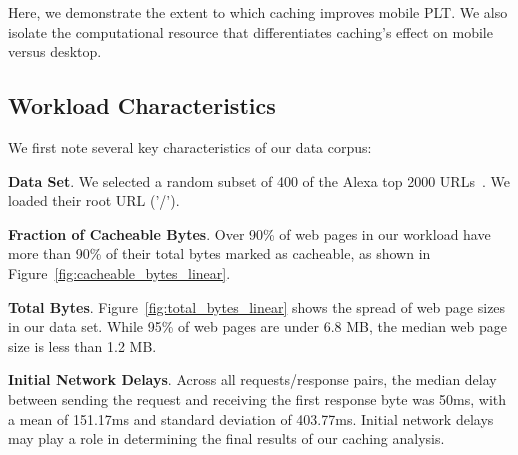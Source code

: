Here, we demonstrate the extent to which caching improves mobile PLT.
We also isolate the computational resource that differentiates caching's effect on mobile versus desktop.

\subsection{Workload Characteristics}
We first note several key characteristics of our data corpus:

\textbf{Data Set}. We selected a random subset of 400 of the Alexa top 2000 URLs~\cite{alexa}. We loaded their root URL ('/').

\textbf{Fraction of Cacheable Bytes}. Over 90\% of web pages in our workload have more than 90\% of their total bytes marked as cacheable, as shown in Figure~\ref{fig:cacheable_bytes_linear}. %

\textbf{Total Bytes}. Figure~\ref{fig:total_bytes_linear} shows the spread of web page sizes in our data set. While 95\% of web pages are under 6.8 MB, the median web page size is less than 1.2 MB.

\textbf{Initial Network Delays}. Across all requests/response pairs, the median delay between sending the request and receiving the first response byte was 50ms, with a mean of 151.17ms and standard deviation of 403.77ms.
Initial network delays may play a role in determining the final results of our caching analysis. 

